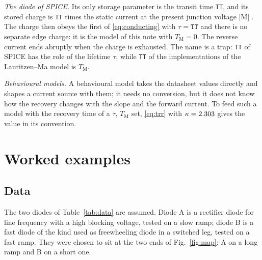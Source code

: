 \documentclass[10pt,a4paper]{scrartcl}
\newcommand{\TM}{T_\mathrm{M}}
\begin{document}
\emph{The diode of SPICE.} Its only storage parameter is the transit time \texttt{TT}, and its stored charge is \texttt{TT} times the static current at the present junction voltage [M] \cite{nagel1975}. The charge then obeys the first of \eqref{eq:conducting} with $\tau = \texttt{TT}$ and there is no separate edge charge: it is the model of this note with $\TM = 0$. The reverse current ends abruptly when the charge is exhausted. The name is a trap: \texttt{TT} of SPICE has the role of the lifetime $\tau$, while \texttt{TT} of the implementations of the Lauritzen--Ma model is $\TM$.

\emph{Behavioural models.} A behavioural model takes the datasheet values directly and shapes a current source with them; it needs no conversion, but it does not know how the recovery changes with the slope and the forward current. To feed such a model with the recovery time of a $\tau$, $\TM$ set, \eqref{eq:trr} with $\kappa = 2.303$ gives the value in its convention.

\section{Worked examples}
\label{sec:examples}
\subsection{Data}
The two diodes of Table~\ref{tab:data} are assumed. Diode A is a rectifier diode for line frequency with a high blocking voltage, tested on a slow ramp; diode B is a fast diode of the kind used as freewheeling diode in a switched leg, tested on a fast ramp. They were chosen to sit at the two ends of Fig.~\ref{fig:map}: A on a long ramp and B on a short one.
\end{document}
